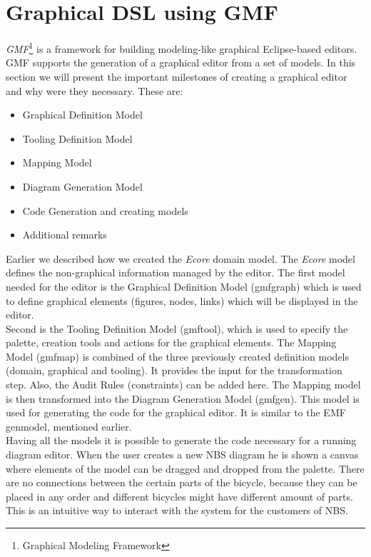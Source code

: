 \section{Graphical DSL using GMF}
\label{sec.gmf}

\noindent \emph{GMF}\footnote{Graphical Modeling Framework} is a framework for
building modeling-like graphical Eclipse-based editors.
\cite{Article_Introducing_GMF} GMF supports the generation of a graphical editor
from a set of models. In this section we will present the important
milestones of creating a graphical editor and why were they necessary. These
are:

\begin{itemize}
  \item Graphical Definition Model
  \item Tooling Definition Model
  \item Mapping Model
  \item Diagram Generation Model
  \item Code Generation and creating models
  \item Additional remarks
\end{itemize}

\noindent Earlier we described how we created the \emph{Ecore} domain model. The
\emph{Ecore} model defines the non-graphical information managed by the editor. The first
model needed for the editor is the Graphical Definition Model (gmfgraph) which
is used to define graphical elements (figures, nodes, links)
which will be displayed in the editor. \\

\noindent Second is the Tooling Definition Model (gmftool),
which is used to specify the palette, creation tools and actions for the
graphical elements. The Mapping Model (gmfmap) is combined of the three
previously created definition models (domain, graphical and tooling).
It provides the input for the transformation step. Also, the Audit Rules
(constraints) can be added here. The Mapping model is then transformed into the Diagram
Generation Model (gmfgen). This model is used for generating the code for the graphical
editor. It is similar to the EMF genmodel, mentioned earlier.
\cite{GMF_Tutorial}\\

\noindent Having all the models it is possible to generate the code necessary
for a running diagram editor. When the user creates a new NBS diagram he is
shown a canvas where elements of the model can be dragged and dropped from the
palette. There are no connections between the certain parts
of the bicycle, because they can be placed in any order and different bicycles
might have different amount of parts. This is an intuitive way to interact
with the system for the customers of NBS.\\

